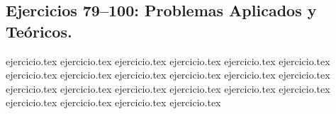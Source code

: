 \subsection*{Ejercicios 79--100: Problemas Aplicados y Teóricos.}
\begin{enumerate}
    \setcounter{enumi}{78}
    {ejercicio.tex}
    {ejercicio.tex}
    {ejercicio.tex}
    {ejercicio.tex}
    {ejercicio.tex}
    {ejercicio.tex}
    {ejercicio.tex}
    {ejercicio.tex}
    {ejercicio.tex}
    {ejercicio.tex}
    {ejercicio.tex}
    {ejercicio.tex}
    {ejercicio.tex}
    {ejercicio.tex}
    {ejercicio.tex}
    {ejercicio.tex}
    {ejercicio.tex}
    {ejercicio.tex}
    {ejercicio.tex}
    {ejercicio.tex}
    {ejercicio.tex}
    {ejercicio.tex}
\end{enumerate}
